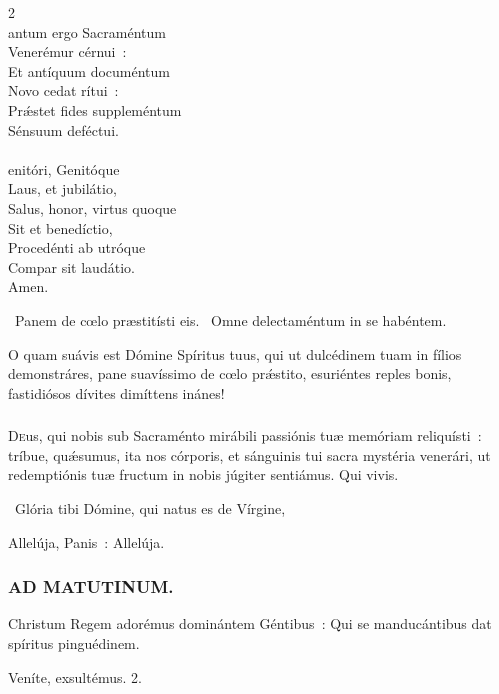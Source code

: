 \documentclass[9pt,twoside]{extarticle}
\begin{document}
\begin{multicols}{2}
\\
antum ergo Sacraméntum\\ 
Venerémur cérnui~:\\ 
Et antíquum documéntum\\ 
Novo cedat rítui~:\\ 
Prǽstet fides suppleméntum\\ 
Sénsuum deféctui.\\
\\
enitóri, Genitóque\\ 
Laus, et jubilátio,\\ 
Salus, honor, virtus quoque\\ 
Sit et benedíctio,\\ 
Procedénti ab utróque\\ 
Compar sit laudátio.\\
Amen.

\begin{tightlist}{}
\item {}~Panem de cœlo præstitísti eis. ~Omne delectaméntum in se habéntem.
\item {} O quam suávis est Dómine Spíritus tuus, qui ut dulcédinem tuam in fílios demonstráres, pane suavíssimo de cœlo prǽstito, esuriéntes reples bonis, fastidiósos dívites dimíttens inánes!
\end{tightlist}
\subsubsection*{\center {}}
\lettrine{D}eus, qui nobis sub Sacraménto mirábili passiónis tuæ memóriam reliquísti~: tríbue, quǽsumus, ita nos córporis, et sánguinis tui sacra mystéria venerári, ut redemptiónis tuæ fructum in nobis júgiter sentiámus. Qui vivis.

\begin{tightlist}{}
\item {}~Glória tibi Dómine, qui natus es de Vírgine, 
\item {} Allelúja, Panis~:  Allelúja.
\end{tightlist}

\subsubsection*{\center \textsc{AD MATUTINUM.}}
\begin{tightlist}{}
\item {} Christum Regem adorémus dominántem Géntibus~: \textred{*} Qui se manducántibus dat spíritus pinguédinem.
\item {} Veníte, exsultémus. 2.
\end{tightlist}


\end{multicols}
\end{document}
